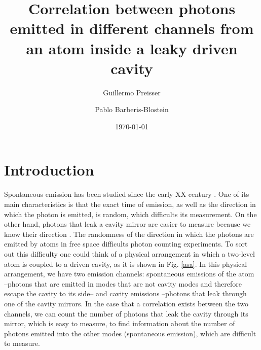 \documentclass[epj,final]{svjour}
\begin{document}
\title{Correlation between photons emitted in different channels from
  an atom inside a leaky driven cavity}%

\author{Guillermo Preisser \and  Pablo Barberis-Blostein}




\date{\today}
             



\maketitle


\section{Introduction}

Spontaneous emission has been studied since the early XX century
\cite{10.2307/94746} \cite{1917PhyZ...18..121E}. One of its main
characteristics is that the exact time of emission, as well as the
direction in which the photon is emitted, is random, which difficults
its measurement. On the other hand, photons that leak a cavity mirror
are easier to measure because we know their direction
\cite{326305} \cite{doi:10.1063/1.113345}. The randomness of the direction in
which the photons are emitted by atoms in free space difficults photon
counting experiments. To sort out this difficulty one could think of a
physical arrangement in which a two-level atom is coupled to a driven
cavity, as it is shown in Fig. \ref{asa}. In this physical
arrangement, we have two emission channels: spontaneous emissions of
the atom --photons that are emitted in modes that are not cavity modes
and therefore escape the cavity to its side-- and cavity emissions
--photons that leak through one of the cavity mirrors. In the case
that a correlation exists between the two channels, we can count the
number of photons that leak the cavity through its mirror, which is
easy to measure, to find information about the number of photons
emitted into the other modes (spontaneous emission), which are
difficult to measure.
\end{document}
